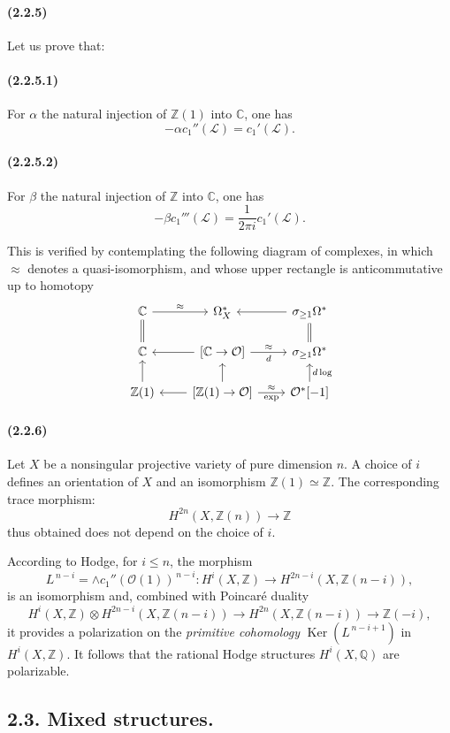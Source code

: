 \documentclass[10pt]{article}
\newcommand{\C}{\mathbb C}
\newcommand{\Q}{\mathbb Q}
\newcommand{\Z}{\mathbb Z}
\newcommand{\Ker}{\operatorname{Ker}}
\providecommand{\cO}{\mathcal O}
\providecommand{\cL}{\mathcal L}
\providecommand{\cO}{\mathcal O}
\providecommand{\cL}{\mathcal L}
\newcommand{\dlog}{d\log}
\begin{document}
\paragraph{(2.2.5)} Let us prove that:
\paragraph{(2.2.5.1)} For $\alpha$ the natural injection of $\Z(1)$ into $\C$, one has
\[
-\alpha c_1''(\cL)=c_1'(\cL).
\]
\paragraph{(2.2.5.2)} For $\beta$ the natural injection of $\Z$ into $\C$, one has
\[
-\beta c_1'''(\cL)=\frac{1}{2\pi i}c_1'(\cL).
\]

This is verified by contemplating the following diagram of complexes, in which $\approx$ denotes a quasi-isomorphism, and whose upper rectangle is anticommutative up to homotopy
\[
\begin{tikzcd}[column sep=2.2em,row sep=1.5em]
\C \arrow[r,"\approx"] \arrow[d,equal] & \Omega_X^* & \sigma_{\ge1}\Omega^* \arrow[l] \arrow[d,equal]\\
\C & {[\C\to\cO]} \arrow[l] \arrow[r,"\approx","d"'] & \sigma_{\ge1}\Omega^*\\
\Z(1) \arrow[u] & {[\Z(1)\to\cO]} \arrow[l] \arrow[r,"\approx","{\exp}"'] \arrow[u] & \cO^*[-1] \arrow[u,"\dlog"']
\end{tikzcd}
\]

\paragraph{(2.2.6)} Let $X$ be a nonsingular projective variety of pure dimension $n$. A choice of $i$ defines an orientation of $X$ and an isomorphism $\Z(1)\simeq\Z$. The corresponding trace morphism:
\[
H^{2n}(X,\Z(n))\longrightarrow \Z
\]
thus obtained does not depend on the choice of $i$.

According to Hodge, for $i\le n$, the morphism
\[
L^{\,n-i}=\wedge c_1''(\cO(1))^{\,n-i}:H^i(X,\Z)\longrightarrow H^{2n-i}(X,\Z(n-i)),
\]
is an isomorphism and, combined with Poincaré duality
\[
H^i(X,\Z)\otimes H^{2n-i}(X,\Z(n-i))\longrightarrow
H^{2n}(X,\Z(n-i))\longrightarrow \Z(-i),
\]
it provides a polarization on the \emph{primitive cohomology} $\Ker(L^{\,n-i+1})$ in $H^i(X,\Z)$. It follows that the rational Hodge structures $H^i(X,\Q)$ are polarizable.

\subsection*{2.3. Mixed structures.}
\end{document}
